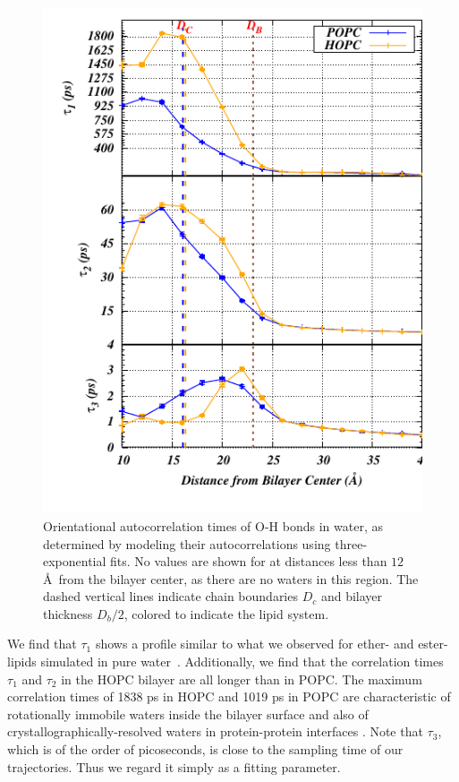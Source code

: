 \documentclass[12pt,preprint,times,openany,draft]{book}
\begin{document}
\begin{figure}
\caption{ 
Orientational autocorrelation times of O-H bonds in water, as determined by modeling their autocorrelations using three-exponential fits. 
No values are shown for at distances less than $12$ \AA~from the bilayer center, as there are no waters in this region. 
The dashed vertical lines indicate chain boundaries $D_c$ and bilayer thickness $D_b/2$, colored to indicate the lipid system.}
\label{fig:waterautotime}
\includegraphics[width=\textwidth]{Corrtime}
\end{figure}
We find that $\tau_1$ shows a profile similar to what we observed for ether- and ester-lipids 
simulated in pure water~\cite{kruczek:2017:ether}. Additionally, we find that the correlation times $\tau_1$ and $\tau_2$ in the 
HOPC bilayer are all longer than in POPC. The maximum correlation times of 1838 ps in HOPC and 1019 ps in 
POPC are characteristic of rotationally immobile waters inside the bilayer surface 
and also of crystallographically-resolved waters in 
protein-protein interfaces \cite{dutta:2014}. Note that $\tau_3$, which is of the order of picoseconds, is close to the sampling time of our trajectories. Thus we regard it simply as a fitting parameter.
\end{document}

